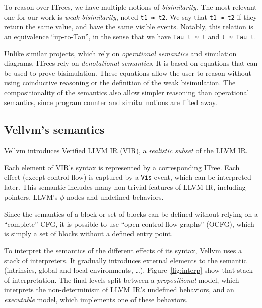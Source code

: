 \documentclass[11pt]{article}
\newcommand{\inlinecoq}[1]{\mbox{\lstinline[style=customcoq,columns=fixed,basewidth=.48em]{#1}}}
\newcommand{\ilc}[1]{\inlinecoq{#1}}
\newcommand{\gr}[1]{\textcolor{Orange}{#1}}
\newcommand{\ocfg}{OCFG\xspace}
\begin{document}
To reason over ITrees, we have multiple notions of \emph{bisimilarity}. The most relevant one for our work is \emph{weak bisimilarity}, noted \ilc{t1 ≈ t2}. We say that \ilc{t1 ≈ t2} if they return the same value, and have the same visible events. Notably, this relation is an equivalence ``up-to-Tau'', in the sense that we have \ilc{Tau t ≈ t} and \ilc{t ≈ Tau t}. 

Unlike similar projects, which rely on \emph{operational semantics} and simulation diagrams, ITrees rely on \emph{denotational semantics}. It is based on equations that can be used to prove bisimulation. These equations allow the user to reason without using coinductive reasoning or the definition of the weak bisimulation. The compositionality of the semantics also allow simpler reasoning than operational semantics, since program counter and similar notions are lifted away.

\subsection{Vellvm's semantics}

Vellvm introduces Verified LLVM IR (VIR), a \emph{realistic subset} of the LLVM IR.

Each element of VIR's syntax is represented by a corresponding ITree. Each effect (except control flow) is captured by a \ilc{Vis} event, which can be interpreted later. This semantic includes many non-trivial features of LLVM IR, including pointers, LLVM's $\phi$-nodes and undefined behaviors.

Since the semantics of a block or set of blocks can be defined without relying on a ``complete'' CFG, it is possible to use ``open control-flow graphs'' (\ocfg), which is simply a set of blocks without a defined entry point.

To interpret the semantics of the different effects of its syntax, Vellvm uses a stack of interpreters. It gradually introduces external elements to the semantic (intrinsics, global and local environments, \ldots). Figure~\ref{fig:interp} show that stack of interpretation. The final levels split between a \emph{propositional} model, which interprets the non-determinism of LLVM IR's undefined behaviors, and an \emph{executable} model, which implements one of these behaviors.
\end{document}
